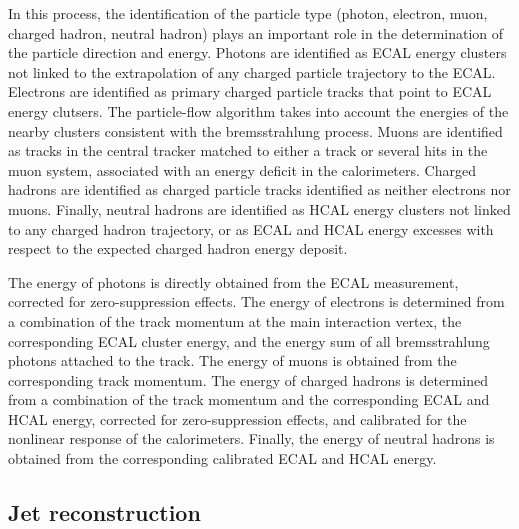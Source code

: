 In this process, the identification of the particle type (photon, electron, muon, charged hadron, neutral hadron) plays an important role in the determination of the particle direction and energy. Photons are identified as ECAL energy clusters not linked to the extrapolation of any charged particle trajectory to the ECAL. Electrons are identified as  primary charged particle tracks that point to ECAL energy clutsers. The particle-flow algorithm takes into account the energies of
 the nearby clusters consistent with the bremsstrahlung process.
Muons are identified as tracks in the central tracker matched to either a track or several hits in the muon system, associated with an energy deficit in the calorimeters. Charged hadrons are identified as charged particle tracks identified as neither electrons nor muons. Finally, neutral hadrons are identified as HCAL energy clusters not linked to any charged hadron trajectory, or as ECAL and HCAL energy excesses with respect to the expected charged hadron energy deposit. 

The energy of photons is directly obtained from the ECAL measurement, corrected for zero-suppression effects. The energy of electrons is determined from a combination of the track momentum at the main interaction vertex, the corresponding ECAL cluster energy, and the energy sum of all bremsstrahlung photons attached to the track. The energy of muons is obtained from the corresponding track momentum. The energy of charged hadrons is determined from a combination of the track momentum and the corresponding ECAL and HCAL energy, corrected for zero-suppression effects, and calibrated for the nonlinear response of the calorimeters. Finally, the energy of neutral hadrons is obtained from the corresponding calibrated ECAL and HCAL energy. 

\subsection{Jet reconstruction}

